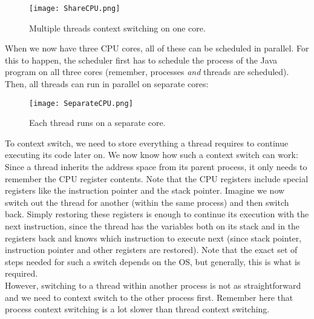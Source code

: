 \documentclass[main]{subfiles}
\begin{document}
\begin{figure}[H]
    \centering
    \texttt{[image: ShareCPU.png]}
    \caption{Multiple threads context switching on one core.}
\end{figure}
When we now have three CPU cores, all of these can be scheduled in parallel. For this to happen, the scheduler first has to schedule the process of the Java program on all three cores (remember, processes \textit{and} threads are scheduled). Then, all threads can run in parallel on separate cores:
\begin{figure}[H]
    \centering
    \texttt{[image: SeparateCPU.png]}
    \caption{Each thread runs on a separate core.}
\end{figure}
To context switch, we need to store everything a thread requires to continue executing its code later on. We now know how such a context switch can work: Since a thread inherits the address space from its parent process, it only needs to remember the CPU register contents. Note that the CPU registers include special registers like the instruction pointer and the stack pointer. Imagine we now switch out the thread for another (within the same process) and then switch back. Simply restoring these registers is enough to continue its execution with the next instruction, since the thread has the variables both on its stack and in the registers back and knows which instruction to execute next (since stack pointer, instruction pointer and other registers are restored). Note that the exact set of steps needed for such a switch depends on the OS, but generally, this is what is required.\\[3mm]
However, switching to a thread within another process is not as straightforward and we need to context switch to the other process first. Remember here that process context switching is a lot slower than thread context switching.

\end{document}
